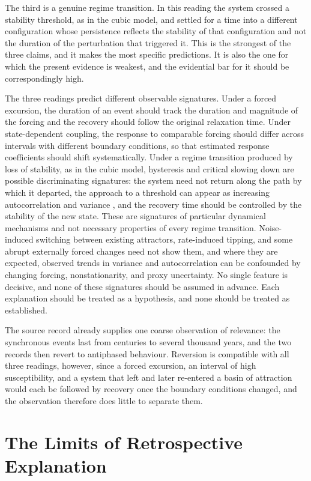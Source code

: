 \documentclass[11pt]{article}
\theoremstyle{definition}
\begin{document}
The third is a genuine regime transition. In this reading the system crossed a stability threshold, as in the cubic model, and settled for a time into a different configuration whose persistence reflects the stability of that configuration and not the duration of the perturbation that triggered it. This is the strongest of the three claims, and it makes the most specific predictions. It is also the one for which the present evidence is weakest, and the evidential bar for it should be correspondingly high.

The three readings predict different observable signatures. Under a forced excursion, the duration of an event should track the duration and magnitude of the forcing and the recovery should follow the original relaxation time. Under state-dependent coupling, the response to comparable forcing should differ across intervals with different boundary conditions, so that estimated response coefficients should shift systematically. Under a regime transition produced by loss of stability, as in the cubic model, hysteresis and critical slowing down are possible discriminating signatures: the system need not return along the path by which it departed, the approach to a threshold can appear as increasing autocorrelation and variance \citep{scheffer2009}, and the recovery time should be controlled by the stability of the new state. These are signatures of particular dynamical mechanisms and not necessary properties of every regime transition. Noise-induced switching between existing attractors, rate-induced tipping, and some abrupt externally forced changes need not show them, and where they are expected, observed trends in variance and autocorrelation can be confounded by changing forcing, nonstationarity, and proxy uncertainty. No single feature is decisive, and none of these signatures should be assumed in advance. Each explanation should be treated as a hypothesis, and none should be treated as established.

The source record already supplies one coarse observation of relevance: the synchronous events last from centuries to several thousand years, and the two records then revert to antiphased behaviour. Reversion is compatible with all three readings, however, since a forced excursion, an interval of high susceptibility, and a system that left and later re-entered a basin of attraction would each be followed by recovery once the boundary conditions changed, and the observation therefore does little to separate them.

\section{The Limits of Retrospective Explanation}
\end{document}
